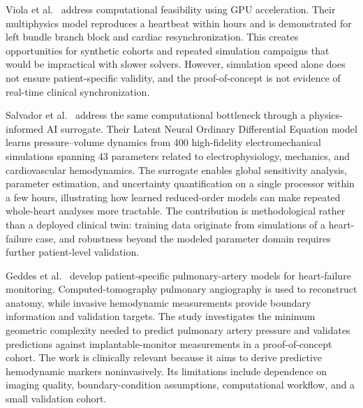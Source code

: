 Viola et al.~\cite{viola2023gpu} address computational feasibility using GPU acceleration. Their multiphysics model reproduces a heartbeat within hours and is demonstrated for left bundle branch block and cardiac resynchronization. This creates opportunities for synthetic cohorts and repeated simulation campaigns that would be impractical with slower solvers. However, simulation speed alone does not ensure patient-specific validity, and the proof-of-concept is not evidence of real-time clinical synchronization.

Salvador et al.~\cite{salvador2024latent} address the same computational bottleneck through a physics-informed AI surrogate. Their Latent Neural Ordinary Differential Equation model learns pressure--volume dynamics from 400 high-fidelity electromechanical simulations spanning 43 parameters related to electrophysiology, mechanics, and cardiovascular hemodynamics. The surrogate enables global sensitivity analysis, parameter estimation, and uncertainty quantification on a single processor within a few hours, illustrating how learned reduced-order models can make repeated whole-heart analyses more tractable. The contribution is methodological rather than a deployed clinical twin: training data originate from simulations of a heart-failure case, and robustness beyond the modeled parameter domain requires further patient-level validation.

Geddes et al.~\cite{geddes2025rightheart} develop patient-specific pulmonary-artery models for heart-failure monitoring. Computed-tomography pulmonary angiography is used to reconstruct anatomy, while invasive hemodynamic measurements provide boundary information and validation targets. The study investigates the minimum geometric complexity needed to predict pulmonary artery pressure and validates predictions against implantable-monitor measurements in a proof-of-concept cohort. The work is clinically relevant because it aims to derive predictive hemodynamic markers noninvasively. Its limitations include dependence on imaging quality, boundary-condition assumptions, computational workflow, and a small validation cohort.

